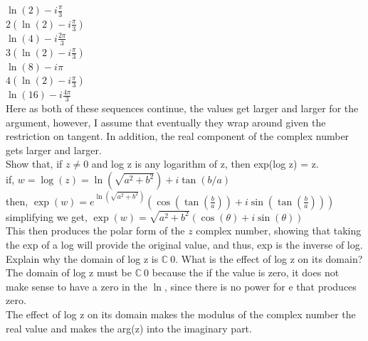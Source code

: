 \documentclass[12pt]{article}
\begin{document}
$\ln(2) - i\frac{\pi}{3}$\\

$2(\ln(2) - i\frac{\pi}{3})$\\
$\ln(4) - i\frac{2\pi}{3}$\\

$3(\ln(2) - i\frac{\pi}{3})$\\
$\ln(8) - i\pi$\\

$4(\ln(2) - i\frac{\pi}{3})$\\
$\ln(16) - i\frac{4\pi}{3}$\\



Here as both of these sequences continue, the values get larger and larger for the argument, however, I assume that eventually they wrap around given the restriction on tangent. 
In addition, the real component of the complex number gets larger and larger.\\ 


 Show that, if $z \ne 0$ and log z is any logarithm of z, then exp(log z) = z.\\

if, $w = \log(z) = \ln(\sqrt{a^2+b^2}) + i\tan(b/a)$\\
then, $\exp(w) = e^{\ln(\sqrt{a^2 + b^2})}(\cos(\tan(\frac{b}{a})) + i\sin(\tan(\frac{b}{a})))$\\
simplifying we get, $\exp(w) = \sqrt{a^2+b^2}(\cos(\theta) + i\sin(\theta))$\\ 

This then produces the polar form of the $z$ complex number, showing that taking the exp of a log will provide the original value, and thus, exp is the inverse of log.\\


 Explain why the domain of log z is $\mathbb{C}\ {0}$. 
What is the effect of log z on its domain?\\

The domain of log z must be $\mathbb{C}\ {0}$ because the if the value is zero, it does not make sense to have a zero in the $\ln$, since there is no power for e that produces zero.\\

The effect of log z on its domain makes the modulus of the complex number the real value and makes the arg(z) into the imaginary part.\\
\end{document}
